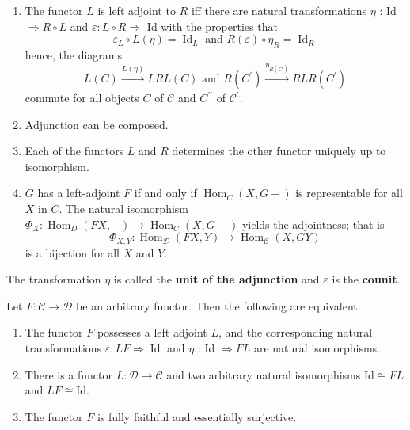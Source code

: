 \begin{prop}
    \begin{enumerate}
      \item The functor $L$ is left adjoint to $R$ iff there are natural transformations $\eta$ : Id $\Rightarrow R \circ L$ and $\varepsilon: L \circ R \Rightarrow$ Id with the properties that
      $$
      \varepsilon_L \circ L(\eta)=\operatorname{Id}_L \text { and } R(\varepsilon) \circ \eta_R=\operatorname{Id}_R
      $$
      hence, the diagrams
      $$
      L(C) \xrightarrow{L(\eta)} L R L(C) \text { and } R\left(C^{\prime}\right) \xrightarrow{\eta_{R\left(C^{\prime}\right)}} R L R\left(C^{\prime}\right)
      $$
      commute for all objects $C$ of $\mathcal{C}$ and $C^{\prime \prime}$ of $\mathcal{C}^{\prime}$.
      \item Adjunction can be composed.
      \item Each of the functors $L$ and $R$ determines the other functor uniquely up to isomorphism.
      \item $G$ has a left-adjoint $F$ if and only if $\operatorname{Hom}_C(X, G-)$ is representable for all $X$ in $C$. The natural isomorphism $\Phi_X: \operatorname{Hom}_D(F X,-) \rightarrow \operatorname{Hom}_C(X, G-)$ yields the adjointness; that is
$$
\Phi_{X, Y}: \operatorname{Hom}_{\mathcal{D}}(F X, Y) \rightarrow \operatorname{Hom}_{\mathcal{C}}(X, G Y)
$$
is a bijection for all $X$ and $Y$.
    \end{enumerate}
\end{prop}
The transformation $\eta$ is called the \textbf{unit of the adjunction} and $\varepsilon$ is the \textbf{counit}.


\begin{theo}
Let $F: \mathcal{C} \rightarrow \mathcal{D}$ be an arbitrary functor. Then the following are equivalent.
\begin{enumerate}
    \item The functor $F$ possesses a left adjoint $L$, and the corresponding natural transformations $\varepsilon: L F \Rightarrow \operatorname{Id}$ and $\eta$ : Id $\Rightarrow F L$ are natural isomorphisms.
    \item There is a functor $L: \mathcal{D} \rightarrow \mathcal{C}$ and two arbitrary natural isomorphisms $\mathrm{Id} \cong F L$ and $L F \cong \mathrm{Id}$.
    \item The functor $F$ is fully faithful and essentially surjective.
\end{enumerate}
\end{theo}

